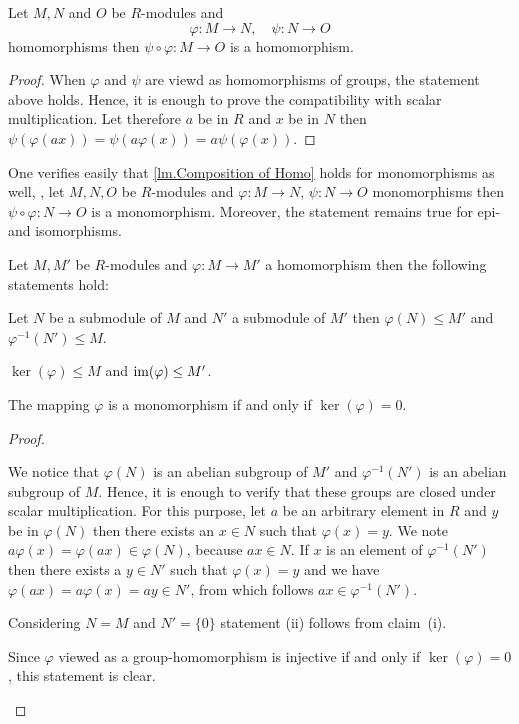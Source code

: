 \begin{lem}\label{lm.Composition of Homo} 
Let $M, N$ and $O$ be $R$-modules and
     \[\varphi\colon M\rightarrow N, \quad \psi\colon N\rightarrow O\] 
homomorphisms then $\psi\circ\varphi\colon M\rightarrow O$ is a homomorphism.
\end{lem}
\begin{proof}
When $\varphi$ and $\psi$ are viewd as homomorphisms of groups, the statement above holds. Hence, it is enough to prove the compatibility with scalar multiplication. Let therefore $a$ be in $R$ and $x$ be in $N$ then $\psi(\varphi(ax))=\psi(a\varphi(x))=a\psi(\varphi(x))$.
\end{proof}

One verifies easily that \cref{lm.Composition of Homo} holds for monomorphisms as well, \ie, let $M, N, O$ be $R$-modules and $\varphi\colon M\rightarrow N$, $\psi\colon N\rightarrow O$ monomorphisms then $\psi\circ\varphi\colon N\rightarrow O$ is a monomorphism. Moreover, the statement remains true for epi- and isomorphisms.

\begin{lem}
Let $M,M'$ be $R$-modules and $\varphi\colon M\rightarrow M'$ a homomorphism then the following statements hold:
\begin{thmlist}
\item Let $N$ be a submodule of $M$ and $N'$ a submodule of $M'$ then $\varphi(N)\leq M'$ and $\varphi^{-1}(N') \leq M$.
\item $\ker(\varphi)\leq M$ and $\operatorname{im}(\varphi)\leq M'$.
\item The mapping $\varphi$ is a monomorphism if and only if $\ker(\varphi)={0}$.
\end{thmlist}
\end{lem}
\begin{proof}
\begin{plist}
\item We notice that $\varphi(N)$ is an abelian subgroup of $M'$ and $\varphi^{-1}(N')$ is an abelian subgroup of $M$. Hence, it is enough to verify that these groups are closed under scalar multiplication. For this purpose, let $a$ be an arbitrary element in $R$ and $y$ be in $\varphi(N)$ then there exists an $x\in N$ such that $\varphi(x)=y$. We note $a\varphi(x)=\varphi(ax)\in\varphi(N)$, because $ax\in N$. If $x$ is an element of $\varphi^{-1}(N')$ then there exists a $y\in N'$ such that $\varphi(x)=y$ and we have $\varphi(ax)=a\varphi(x)=ay\in N'$, from which follows $ax\in \varphi^{-1}(N')$.
\item Considering $N=M$ and $N'=\lbrace 0\rbrace$ statement (ii) follows from claim~(i).
\item Since $\varphi$ viewed as a group-homomorphism is injective if and only if $\ker(\varphi)={0}$, this statement is clear.
\end{plist}
\end{proof}


